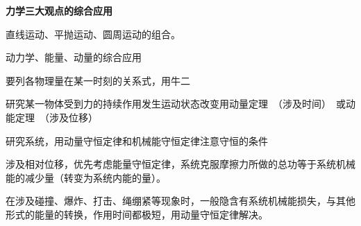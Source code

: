 \textbf{力学三大观点的综合应用}

直线运动、平抛运动、圆周运动的组合。

动力学、能量、动量的综合应用

要列各物理量在某一时刻的关系式，用牛二

研究某一物体受到力的持续作用发生运动状态改变\quad 用动量定理\ （涉及时间）\ 或动能定理\ （涉及位移） %

研究系统，用动量守恒定律和机械能守恒定律\quad 注意守恒的条件

涉及相对位移，优先考虑能量守恒定律，系统克服摩擦力所做的总功等于系统机械能的减少量（转变为系统内能的量）。

在涉及碰撞、爆炸、打击、绳绷紧等现象时，一般隐含有系统机械能损失，与其他形式的能量的转换，作用时间都极短，用动量守恒定律解决。
